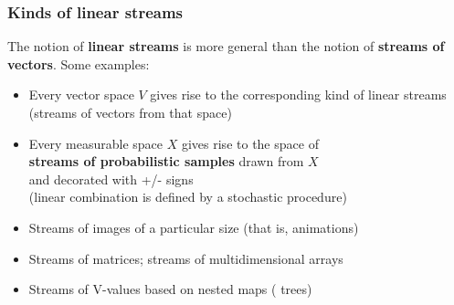 \documentclass{beamer}
\newcommand{\msmagenta}[1]{{\color{mymagenta} #1}}
\begin{document}
\begin{frame}

\frametitle{Kinds of linear streams}

\msmagenta{The notion of {\bf linear streams} is more general than the notion
of {\bf streams of vectors}.} Some examples:\\[1ex]


\begin{itemize}


\item Every vector space $V$ gives rise to the corresponding kind of linear streams
(streams of vectors from that space)\\[2ex]

\item \msmagenta{Every measurable space $X$ gives rise to the space of\\ {\bf streams of
probabilistic samples} drawn from $X$\\ and decorated with +/- signs\\
(linear combination is defined by a stochastic procedure)}\\[2ex]

\item Streams of images of a particular size (that is, animations)\\[2ex]

\item Streams of matrices; streams of multidimensional arrays\\[2ex]

\item Streams of V-values based on nested maps (\msmagenta{trees})\\[2ex]



\end{itemize}

\end{frame}
\end{document}
